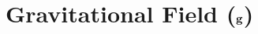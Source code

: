 \documentclass[12pt,compress,aspectratio=169]{beamer}
\newcommand{\mb}[1]{\ensuremath\mathbf{#1}}
\begin{document}
%
%
%
%
%
%
%
%



\section[$\mb{g}$]{Gravitational Field ($\mb{g}$)}
\end{document}
